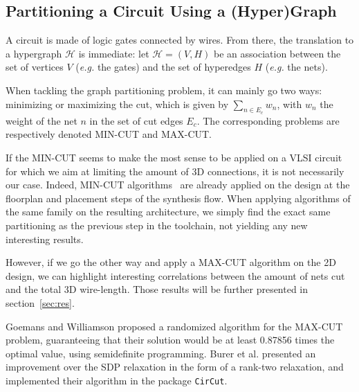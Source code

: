 \documentclass[conference]{IEEEtran}
\begin{document}
\subsection{Partitioning a Circuit Using a (Hyper)Graph}
A circuit is made of logic gates connected by wires.
From there, the translation to a hypergraph $\mathcal{H}$ is immediate: let $\mathcal{H} = (V, H)$ be an association between the set of vertices $V$ (\textit{e.g.} the gates) and the set of hyperedges $H$ (\textit{e.g.} the nets).

When tackling the graph partitioning problem, it can mainly go two ways: minimizing or maximizing the cut, which is given by $\sum_{n \in E_c} w_{n}$, with $w_n$ the weight of the net $n$ in the set of cut edges $E_c$.
The corresponding problems are respectively denoted MIN-CUT and MAX-CUT.

If the MIN-CUT seems to make the most sense to be applied on a VLSI circuit for which we aim at limiting the amount of 3D connections, it is not necessarily our case.
Indeed, MIN-CUT algorithms~\cite{Karypis1999} are already applied on the design at the floorplan and placement steps of the synthesis flow.
When applying algorithms of the same family on the resulting architecture, we simply find the exact same partitioning as the previous step in the toolchain, not yielding any new interesting results.

However, if we go the other way and apply a MAX-CUT algorithm on the 2D design, we can highlight interesting correlations between the amount of nets cut and the total 3D wire-length.
Those results will be further presented in section~\ref{sec:res}.



Goemans and Williamson \cite{Goemans1995} proposed a randomized algorithm for the MAX-CUT problem, guaranteeing that their solution would be at least 0.87856 times the optimal value, using semidefinite programming. Burer et al. \cite{Burer2000} presented an improvement over the SDP relaxation in the form of a rank-two relaxation, and implemented their algorithm in the package \texttt{CirCut}.
\end{document}
